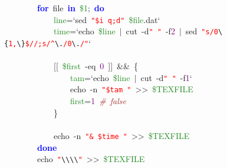 \mbox{}\ \ \ \ \ \ \ \ \textbf{\textcolor{Blue}{for}}\ file\ \textbf{\textcolor{Blue}{in}}\ \textcolor{ForestGreen}{\$1}\textcolor{BrickRed}{;}\ \textbf{\textcolor{Blue}{do}} \\
\mbox{}\ \ \ \ \ \ \ \ \ \ \ \ \textcolor{ForestGreen}{line}\textcolor{BrickRed}{=}`sed\ \texttt{\textcolor{Red}{"{}\$i\ q;d"{}}}\ \textcolor{ForestGreen}{\$file}\textcolor{BrickRed}{.}dat` \\
\mbox{}\ \ \ \ \ \ \ \ \ \ \ \ \textcolor{ForestGreen}{time}\textcolor{BrickRed}{=}`echo\ \textcolor{ForestGreen}{\$line}\ \textcolor{BrickRed}{$|$}\ cut\ -d\texttt{\textcolor{Red}{"{}\ "{}}}\ -f\textcolor{Purple}{2}\ \textcolor{BrickRed}{$|$}\ sed\ \texttt{\textcolor{Red}{"{}s/0}}\texttt{\textcolor{CarnationPink}{\textbackslash{}\{}}\texttt{\textcolor{Red}{1,}}\texttt{\textcolor{CarnationPink}{\textbackslash{}\}}}\texttt{\textcolor{Red}{\$//;s/\textasciicircum{}}}\texttt{\textcolor{CarnationPink}{\textbackslash{}.}}\texttt{\textcolor{Red}{/0}}\texttt{\textcolor{CarnationPink}{\textbackslash{}.}}\texttt{\textcolor{Red}{/"{}}}` \\
\mbox{}\ \ \ \ \ \ \ \ \ \ \ \  \\
\mbox{}\ \ \ \ \ \ \ \ \ \ \ \ \textcolor{BrickRed}{[[}\ \textcolor{ForestGreen}{\$first}\ -eq\ \textcolor{Purple}{0}\ \textcolor{BrickRed}{]]}\ \textcolor{BrickRed}{\&\&}\ \{ \\
\mbox{}\ \ \ \ \ \ \ \ \ \ \ \ \ \ \ \ \textcolor{ForestGreen}{tam}\textcolor{BrickRed}{=}`echo\ \textcolor{ForestGreen}{\$line}\ \textcolor{BrickRed}{$|$}\ cut\ -d\texttt{\textcolor{Red}{"{}\ "{}}}\ -f\textcolor{Purple}{1}` \\
\mbox{}\ \ \ \ \ \ \ \ \ \ \ \ \ \ \ \ echo\ -n\ \texttt{\textcolor{Red}{"{}\$tam\ "{}}}\ \textcolor{BrickRed}{\textgreater{}\textgreater{}}\ \textcolor{ForestGreen}{\$TEXFILE} \\
\mbox{}\ \ \ \ \ \ \ \ \ \ \ \ \ \ \ \ \textcolor{ForestGreen}{first}\textcolor{BrickRed}{=}\textcolor{Purple}{1}\ \textit{\textcolor{Brown}{\#\ false}} \\
\mbox{}\ \ \ \ \ \ \ \ \ \ \ \ \} \\
\mbox{} \\
\mbox{}\ \ \ \ \ \ \ \ \ \ \ \ echo\ -n\ \texttt{\textcolor{Red}{"{}\&\ \$time\ "{}}}\ \textcolor{BrickRed}{\textgreater{}\textgreater{}}\ \textcolor{ForestGreen}{\$TEXFILE} \\
\mbox{}\ \ \ \ \ \ \ \ \textbf{\textcolor{Blue}{done}} \\
\mbox{}\ \ \ \ \ \ \ \ echo\ \texttt{\textcolor{Red}{"{}}}\texttt{\textcolor{CarnationPink}{\textbackslash{}\textbackslash{}\textbackslash{}\textbackslash{}}}\texttt{\textcolor{Red}{"{}}}\ \textcolor{BrickRed}{\textgreater{}\textgreater{}}\ \textcolor{ForestGreen}{\$TEXFILE} \\
